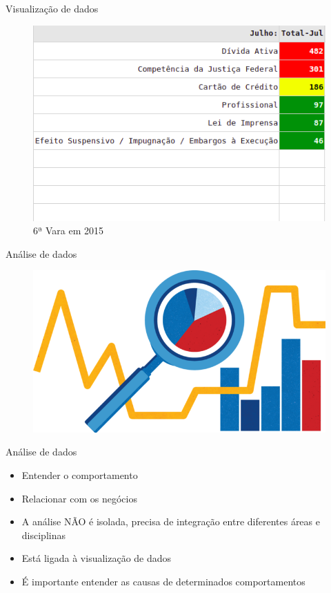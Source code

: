 \documentclass[10pt,t]{beamer}
\begin{document}
\begin{frame}{Visualização de dados}
	\vspace{8pt}
	\begin{figure}
		\centering
		\includegraphics[scale=0.50]{./imagens/painel_exemplo.png}
		\caption{6ª Vara em 2015}
	\end{figure}
\end{frame}

\begin{frame}{Análise de dados}
	\vspace{8pt}
	\begin{figure}
		\centering
		\includegraphics[scale=0.40]{./imagens/analise_dados.png}
	\end{figure}
\end{frame}

\begin{frame}{Análise de dados}
	\vspace{8pt}
	\begin{itemize}
		\item Entender o comportamento
		\item Relacionar com os negócios
		\item A análise NÃO é isolada, precisa de integração entre diferentes áreas e disciplinas
		\item Está ligada à visualização de dados
		\item É importante entender as causas de determinados comportamentos
	\end{itemize}
\end{frame}
\end{document}
